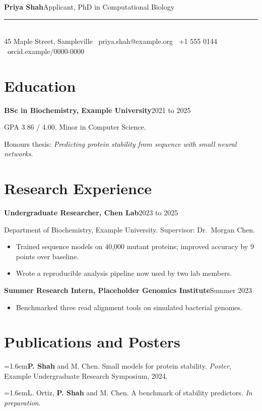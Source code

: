\documentclass[11pt]{article}
\newcommand{\cventry}[2]{\textbf{#1}\hfill #2\par}
\newcommand{\pub}[2]{\hangindent=1.6em\hangafter=1\makebox[1.6em][l]{[#1]}#2\par}
\begin{document}
\hspace*{-3.8cm}\begin{minipage}{\dimexpr\textwidth+3.8cm}
  {\LARGE\bfseries Priya Shah}\hfill{\small Applicant, PhD in Computational Biology}\\[-1ex]
  {\color{ink}\rule{\linewidth}{1pt}}\\
  \small 45 Maple Street, Sampleville \textbullet\ priya.shah@example.org \textbullet\ +1 555 0144 \textbullet\ orcid.example/0000-0000
\end{minipage}

\section{Education}
\cventry{BSc in Biochemistry, Example University}{2021 to 2025}
GPA 3.86 / 4.00. Minor in Computer Science.\par
Honours thesis: \emph{Predicting protein stability from sequence with small neural networks}.

\section{Research Experience}
\cventry{Undergraduate Researcher, Chen Lab}{2023 to 2025}
Department of Biochemistry, Example University. Supervisor: Dr.\ Morgan Chen.
\begin{itemize}
  \item Trained sequence models on 40,000 mutant proteins; improved accuracy by 9 points over baseline.
  \item Wrote a reproducible analysis pipeline now used by two lab members.
\end{itemize}
\cventry{Summer Research Intern, Placeholder Genomics Institute}{Summer 2023}
\begin{itemize}
  \item Benchmarked three read alignment tools on simulated bacterial genomes.
\end{itemize}

\section{Publications and Posters}
\pub{1}{\textbf{P. Shah} and M. Chen. Small models for protein stability. \emph{Poster}, Example Undergraduate Research Symposium, 2024.}
\pub{2}{L. Ortiz, \textbf{P. Shah} and M. Chen. A benchmark of stability predictors. \emph{In preparation}.}
\end{document}
